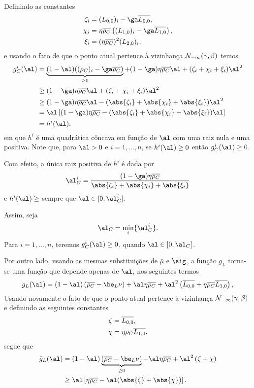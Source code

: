 Definindo as constantes
\[
\begin{aligned}
\zeta_i & = (L_{0,0})_i - \ga \dbvec{L_{0,0}}, \\
\chi_i  & = \eta\dbvec{\rho_C} \left( ({L_{1,0}})_i - \ga\dbvec{L_{1,0}} \right),   \\
\xi_i	& =  (\eta\dbvec{\rho_C})^2(L_{2,0})_i , \\ 	
\end{aligned}
\]
e usando o fato de que o ponto atual pertence à vizinhança $\mathcal{N}_{-\infty}(\gamma,\beta)$ temos
\[
\begin{aligned}
	g_C^i (\al) & = \underbrace{(1-\al)((\rho_C)_i - \ga\dbvec{\rho_C})}_{\geq 0}  + (1-\ga)\eta\dbvec{\rho_C} \al+  (\zeta_i + 				\chi_i + \xi_i)\al^2  \\
				& \geq (1-\ga)\eta\dbvec{\rho_C} \al +  (\zeta_i + 				\chi_i + \xi_i)\al^2 \\ 
				& \geq (1-\ga)\eta\dbvec{\rho_C} \al -  (\abs{\zeta_i} + \abs{\chi_i} + \abs{\xi_i})\al^2 \\
				& = \al \left[	(1-\ga)\eta\dbvec{\rho_C}  -  (\abs{\zeta_i} + \abs{\chi_i} + \abs{\xi_i})\al	\right] \\
				& = h^i(\al).
\end{aligned}
\]
em que $h^i$ é uma quadrática côncava em função de $\al$ com uma raiz nula e uma positiva. Note que, para $\al>0$ e $i=1,\ldots,n$, se $h^i(\al)\geq0$ então $g_C^i(\al)\geq 0$. 

Com efeito, a única raiz positiva de $h^i$ é dada por
\[
\al_{C}^i = \dfrac{(1-\ga)\eta\dbvec{\rho_C}}{\abs{\zeta_i} + \abs{\chi_i} + \abs{\xi_i}}
\]
e $h^i(\al)\geq$ sempre que $\al\in[0,\al_{C}^i].$ 


Assim, seja
\[
\al_C = \min_i\{\al_C^i\}.
\] 
Para $i=1,\ldots,n$, teremos $g_C^i(\al)\geq 0$, quando  
$\al\in[0,\al_C]$. 







Por outro lado, usando as mesmas substituições de $\bar{\mu}$ e $\bar{\sig}$, a função $g_L$ torna-se uma função que depende apenas de $\al$, nos seguintes termos 
\[
g_L(\al) =     (1-\al)\left(\dbvec{\rho_C} -  \be_L \nu   \right) +  \al\eta\dbvec{\rho_C} + 
   \al^2\left( \dbvec{L_{0,0}} + \eta\dbvec{\rho_C}  \dbvec{L_{1,0}}   \right ) ,
\]
Usando novamente o fato de que o ponto atual pertence à  vizinhança $\mathcal{N}_{-\infty}(\gamma,\beta)$ e definindo as seguintes constantes 
\[
\begin{aligned}
\zeta & =  \overline{L_{0,0}}, \\
\chi  & = \eta\overline{\rho_C} \overline{L_{1,0}},
\end{aligned}
\]
segue que 
 \[
\begin{aligned}
\bar{g}_L(\al) & =     (1-\al)\underbrace{\left(\dbvec{\rho_C} -  \be_L \nu   \right)}_{\geq 0} +  \al\eta\dbvec{\rho_C} + 
   \al^2\left( \zeta + \chi   \right ) \\
   & \geq  \al\left[\eta\dbvec{\rho_C} - 
   \al (\abs{\zeta} + \abs{\chi})   \right ].
\end{aligned}
 \]




